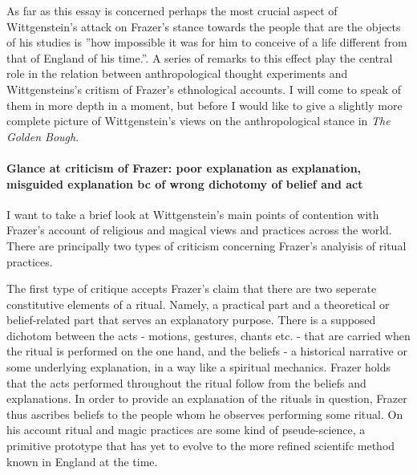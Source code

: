 \documentclass{article}
\begin{document}
As far as this essay is concerned perhaps the most crucial aspect of Wittgenstein's attack on Frazer's stance towards the people that are the objects of his studies is ''how impossible it was for him to conceive of a life different from that of England of his time.''. A series of remarks to this effect play the central role in the relation between anthropological thought experiments and Wittgensteins's critism of Frazer's ethnological accounts. I will come to speak of them in more depth in a moment, but before I would like to give a slightly more complete picture of Wittgenstein's views on the anthropological stance in \textit{The Golden Bough}.
 
\paragraph{Glance at criticism of Frazer: poor explanation as explanation, misguided explanation bc of wrong dichotomy of belief and act}
I want to take a brief look at Wittgenstein's main points of contention with Frazer's account of religious and magical views and practices across the world. There are principally two types of criticism concerning Frazer's analyisis of ritual practices. 

The first type of critique accepts Frazer's claim that there are two seperate constitutive elements of a ritual. Namely, a practical part and a theoretical or belief-related part that serves an explanatory purpose. There is a supposed dichotom between the acts - motions, gestures, chants etc. - that are carried when the ritual is performed on the one hand, and the beliefs - a historical narrative or some underlying explanation, in a way like a spiritual mechanics. Frazer holds that the acts performed throughout the ritual follow from the beliefs and explanations. In order to provide an explanation of the rituals in question, Frazer thus ascribes beliefs to the people whom he observes performing some ritual. On his account ritual and magic practices are some kind of pseude-science, a primitive prototype that has yet to evolve to the more refined scientifc method known in England at the time. 
\end{document}

